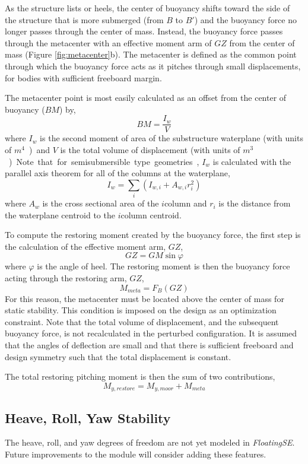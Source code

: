 As the structure lists or heels, the center of buoyancy shifts toward
the side of the structure that is more submerged (from $B$ to $B'$) and
the buoyancy force no longer passes through the center of mass.
Instead, the buoyancy force passes through the metacenter with an
effective moment arm of $GZ$ from the center of mass (Figure
\ref{fig:metacenter}b).  The metacenter is defined as the common point
through which the buoyancy force acts as it pitches through small
displacements, for bodies with sufficient freeboard margin.

The metacenter point is most easily calculated as an offset from the
center of buoyancy ($BM$) by,
\[
  BM = \frac{I_w}{V}
\]
where $I_w$ is the second moment of area of the substructure waterplane
(with units of \unit{$m^4$}) and $V$ is the total volume of displacement
(with units of \unit{$m^3$}).  Note that for semisubmersible type
geometries, $I_w$ is calculated with the parallel axis theorem for all
of the columns at the waterplane,
\[
  I_w = \sum_i \left( I_{w,i} + A_{w,i}r_i^2 \right)
\]
where $A_w$ is the cross sectional area of the $i$\th column and $r_i$
is the distance from the waterplane centroid to the $i$\th column centroid.

To compute the restoring moment created by the buoyancy force, the first
step is the calculation of the effective moment arm, $GZ$,
\[
GZ = GM \sin \varphi
\]
where $\varphi$ is the angle of heel.  The restoring moment is then the
buoyancy force acting through the restoring arm, $GZ$,
\[
  M_{meta} = F_B \left(GZ\right)
\]
For this reason, the metacenter must be located above the center of mass
for static stability.  This condition is imposed on the design as an
optimization constraint.  Note that the total volume of displacement,
and the subsequent buoyancy force, is not recalculated in the perturbed
configuration.  It is assumed that the angles of deflection are small
and that there is sufficient freeboard and design symmetry such that the
total displacement is constant.

The total restoring pitching moment is then the sum of two
contributions,
\[
  M_{y,restore} = M_{y,moor} + M_{meta}
\]

\subsection{Heave, Roll, Yaw Stability}
The heave, roll, and yaw degrees of freedom are not yet modeled in
\textit{FloatingSE}.  Future improvements to the module will consider adding
these features.

